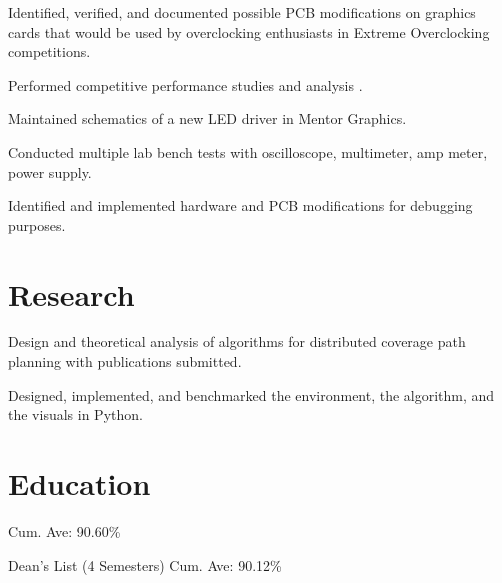 \documentclass[]{deedy-resume-openfont}
\begin{document}
\begin{tightemize}
\item Identified, verified, and documented possible PCB modifications on graphics cards that would be used by overclocking enthusiasts in Extreme Overclocking competitions.
\item Performed competitive performance studies and analysis .
\end{tightemize}
\sectionsep

\begin{tightemize}
\item Maintained schematics of a new LED driver in Mentor Graphics.
\item Conducted multiple lab bench tests with oscilloscope, multimeter, amp meter, power supply.
\item Identified and implemented hardware and PCB modifications for debugging purposes.
\end{tightemize}
\sectionsep


\section{Research}
\begin{tightemize}
\item Design and theoretical analysis of algorithms for distributed coverage path planning with publications submitted.
\item Designed, implemented, and benchmarked the environment, the algorithm, and the visuals in Python.
\end{tightemize}
\sectionsep

\section{Education}
Cum. Ave: 90.60\% \\
\sectionsep

Dean's List (4 Semesters) \textbullet{}
Cum. Ave: 90.12\% \\
\sectionsep
\end{document}
